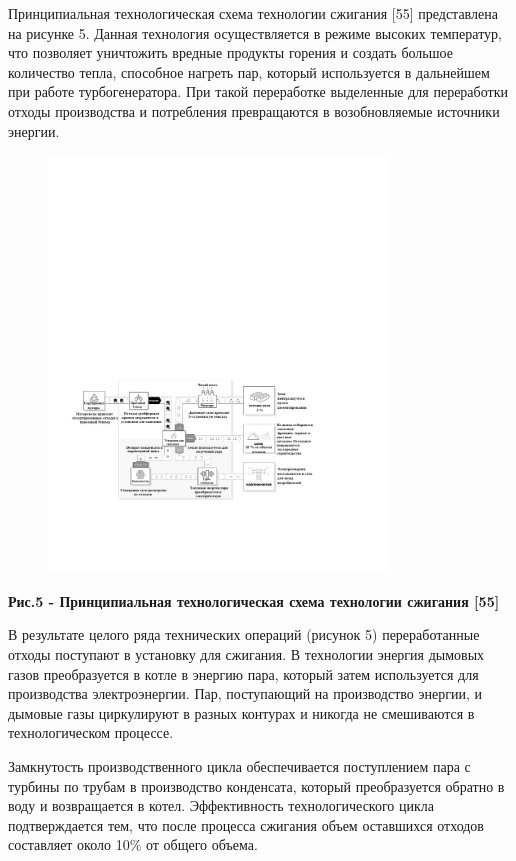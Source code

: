 Принципиальная технологическая схема технологии сжигания {[}55{]}
представлена на рисунке 5. Данная технология осуществляется в режиме
высоких температур, что позволяет уничтожить вредные продукты горения и
создать большое количество тепла, способное нагреть пар, который
используется в дальнейшем при работе турбогенератора. При такой
переработке выделенные для переработки отходы производства и потребления
превращаются в возобновляемые источники энергии.


\begin{figure}[H]
	\centering
	\includegraphics[width=0.8\textwidth]{media/chem2/image68}
	\caption*{}
\end{figure}


{\bfseries Рис.5 - Принципиальная технологическая схема технологии
сжигания {[}55{]}}

В результате целого ряда технических операций (рисунок 5) переработанные
отходы поступают в установку для сжигания. В технологии энергия дымовых
газов преобразуется в котле в энергию пара, который затем используется
для производства электроэнергии. Пар, поступающий на производство
энергии, и дымовые газы циркулируют в разных контурах и никогда не
смешиваются в технологическом процессе.

Замкнутость производственного цикла обеспечивается поступлением пара с
турбины по трубам в производство конденсата, который преобразуется
обратно в воду и возвращается в котел. Эффективность технологического
цикла подтверждается тем, что после процесса сжигания объем оставшихся
отходов составляет около 10\% от общего объема.

